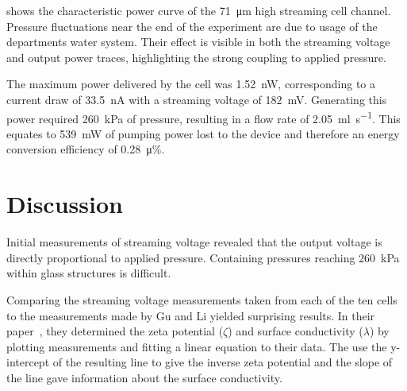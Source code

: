      shows the characteristic power curve of the \SI{71}{\micro\meter} high streaming cell channel.
    Pressure fluctuations near the end of the experiment are due to usage of the departments water system.
    Their effect is visible in both the streaming voltage and output power traces, highlighting the strong coupling to applied pressure.

    The maximum power delivered by the cell was \SI{1.52}{\nano\watt}, corresponding to a current draw of \SI{33.5}{\nano\ampere} with a streaming voltage of \SI{182}{\milli\volt}.
    Generating this power required \SI{260}{\kilo\pascal} of pressure, resulting in a flow rate of \SI{2.05}{\milli\litre\per\second}.
    This equates to \SI{539}{\milli\watt} of pumping power lost to the device and therefore an energy conversion efficiency of \SI{0.28}{\micro\percent}.


\section{Discussion}
  \label{sect:part1_energyHarvesting_discussion}


  Initial measurements of streaming voltage revealed that the output voltage is directly proportional to applied pressure.
  Containing pressures reaching \SI{260}{\kilo\pascal} within glass structures is difficult.

  Comparing the streaming voltage measurements taken from each of the ten cells to the measurements made by Gu and Li yielded surprising results.
  In their paper~\cite{Gu2000}, they determined the zeta potential ($\zeta$) and surface conductivity ($\lambda$) by plotting measurements and fitting a linear equation to their data.
  The use the y-intercept of the resulting line to give the inverse zeta potential and the slope of the line gave information about the surface conductivity.


